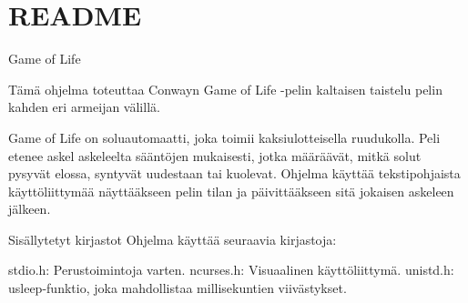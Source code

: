 \chapter{README}
\hypertarget{md__r_e_a_d_m_e}{}\label{md__r_e_a_d_m_e}
Game of Life

Tämä ohjelma toteuttaa Conwayn Game of Life -\/pelin kaltaisen taistelu pelin kahden eri armeijan välillä.

Game of Life on soluautomaatti, joka toimii kaksiulotteisella ruudukolla. Peli etenee askel askeleelta sääntöjen mukaisesti, jotka määräävät, mitkä solut pysyvät elossa, syntyvät uudestaan tai kuolevat. Ohjelma käyttää tekstipohjaista käyttöliittymää näyttääkseen pelin tilan ja päivittääkseen sitä jokaisen askeleen jälkeen.

Sisällytetyt kirjastot Ohjelma käyttää seuraavia kirjastoja\+:

stdio.\+h\+: Perustoimintoja varten. ncurses.\+h\+: Visuaalinen käyttöliittymä. unistd.\+h\+: usleep-\/funktio, joka mahdollistaa millisekuntien viivästykset. 